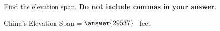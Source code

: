 \documentclass{ximera}[font=12pt]
\begin{document}
\begin{problem}
\begin{problem}
\begin{center}
\end{center}



\begin{multipleChoice}
\end{multipleChoice}

\end{problem}


\begin{problem}
Find the elevation span.  \textbf{Do not include commas in your answer}.

China's Elevation Span =  $\answer{29537}$ \ feet

\end{problem}
\end{problem}


\newpage
\end{document}
